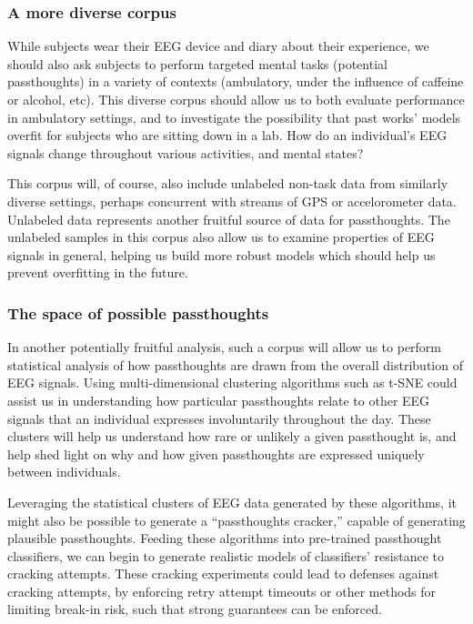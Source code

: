 \documentclass[sigconf]{acmart}
\begin{document}
\subsubsection{A more diverse corpus}
\label{sec:org5eb9cdc}

While subjects wear their EEG device and diary about their experience, we should also ask subjects to perform
targeted mental tasks (potential passthoughts) in a variety of contexts (ambulatory, under the influence of caffeine or alcohol, etc). 
This diverse corpus should allow us to both evaluate performance in ambulatory settings, and to
investigate the possibility that past works' models overfit for subjects who are sitting down in a lab.
How do an individual's EEG signals change throughout various activities, and mental states?

This corpus will, of course, also include unlabeled non-task data from similarly diverse settings, perhaps concurrent with streams of GPS or accelorometer data.
Unlabeled data represents another fruitful source of data for passthoughts.
The unlabeled samples in this corpus also allow us to examine properties of EEG signals in general, helping us build more robust models which should help us prevent overfitting in the future.

\subsubsection{The space of possible passthoughts}
\label{sec:org40f3dce}
In another potentially fruitful analysis, such a corpus will allow us to perform statistical analysis of how passthoughts are drawn from the overall distribution of EEG signals. 
Using multi-dimensional clustering algorithms such as t-SNE \cite{VanDerMaaten2008} 
could assist us in understanding how particular passthoughts relate to other EEG signals that an individual expresses involuntarily throughout the day. 
These clusters will help us understand how rare or unlikely a given passthought is, and help shed light on why and how given passthoughts are expressed uniquely between individuals.

Leveraging the statistical clusters of EEG data generated by these algorithms, it might also be possible to generate a ``passthoughts cracker,'' capable of generating plausible passthoughts. 
Feeding these algorithms into pre-trained passthought classifiers, we can begin to generate realistic models of classifiers' resistance to cracking attempts. 
These cracking experiments could lead to defenses against cracking attempts, by enforcing retry attempt timeouts or other methods for limiting break-in risk, such that strong guarantees can be enforced.
\end{document}
